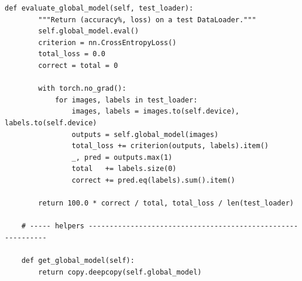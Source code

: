 \begin{lstlisting}[caption={FedAvg Server (server\_fedavg.py)}, label={lst:fedavg}]
    def evaluate_global_model(self, test_loader):
        """Return (accuracy%, loss) on a test DataLoader."""
        self.global_model.eval()
        criterion = nn.CrossEntropyLoss()
        total_loss = 0.0
        correct = total = 0

        with torch.no_grad():
            for images, labels in test_loader:
                images, labels = images.to(self.device), labels.to(self.device)
                outputs = self.global_model(images)
                total_loss += criterion(outputs, labels).item()
                _, pred = outputs.max(1)
                total   += labels.size(0)
                correct += pred.eq(labels).sum().item()

        return 100.0 * correct / total, total_loss / len(test_loader)

    # ----- helpers ------------------------------------------------------------

    def get_global_model(self):
        return copy.deepcopy(self.global_model)
\end{lstlisting}

